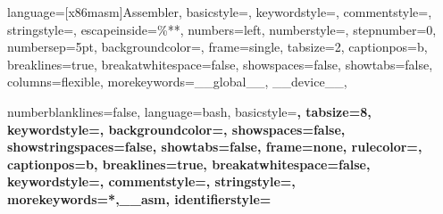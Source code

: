  {
language=[x86masm]Assembler,            %
basicstyle=\ttfamily,                   %
keywordstyle=\color{blue},              %
commentstyle=\color{dkgreen},           %
stringstyle=\color{mauve},              %
escapeinside={\%*}{*},                  %
numbers=left,                           %
numberstyle=\tiny,                      %
stepnumber=0,                           %
numbersep=5pt,                          %
backgroundcolor=\color{lightlightgray}, %
frame=single,
tabsize=2,                              %
captionpos=b,                           %
breaklines=true,                        %
breakatwhitespace=false,                %
showspaces=false,                       %
showtabs=false,                         %
columns=flexible,                       %
morekeywords={__global__, __device__},  %
}

{
    numberblanklines=false,
    language=bash,
    basicstyle=\ttfamily\color{white}\bfseries, %
    tabsize=8,
    keywordstyle=\color{red},
    backgroundcolor=\color{black},
    showspaces=false,
    showstringspaces=false,
    showtabs=false,
    frame=none,
    rulecolor=\color{black},
    captionpos=b,                   %
    breaklines=true,                %
    breakatwhitespace=false,        %
    keywordstyle=\color{blue},      %
    commentstyle=\color{dkgreen},   %
    stringstyle=\color{mauve},      %
    morekeywords={*,__asm},         %
    identifierstyle= %
}

